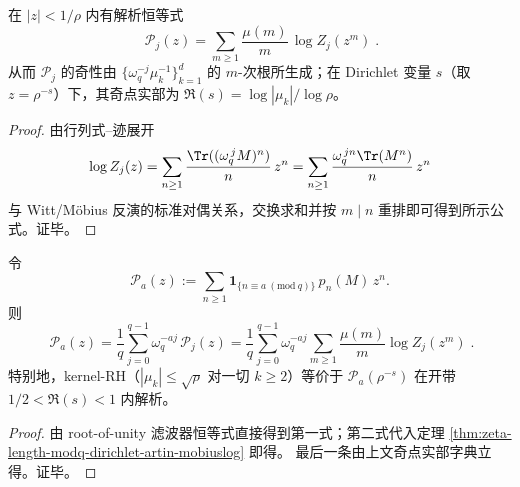 \begin{theorem}\label{thm:zeta-length-modq-dirichlet-artin-mobiuslog}
在 \(|z|<1/\rho\) 内有解析恒等式
\[
\boxed{\;
\mathcal{P}_j(z)=\sum_{m\ge1}\frac{\mu(m)}{m}\,\log Z_j(z^m)\; }.
\]
从而 \(\mathcal{P}_j\) 的奇性由 \(\{\omega_q^{-j}\mu_k^{-1}\}_{k=1}^d\) 的 \(m\)-次根所生成；在 Dirichlet 变量 \(s\)（取 \(z=\rho^{-s}\)）下，其奇点实部为
\(
\Re(s)=\log|\mu_k|/\log\rho
\)。
\end{theorem}
\begin{proof}
由行列式--迹展开
\[
\log Z_j(z)=\sum_{n\ge1}\frac{\Tr((\omega_q^{\,j}M)^n)}{n}\,z^n
=\sum_{n\ge1}\frac{\omega_q^{\,jn}\Tr(M^n)}{n}\,z^n
\]
与 Witt/Möbius 反演的标准对偶关系，交换求和并按 \(m\mid n\) 重排即可得到所示公式。证毕。
\end{proof}

\begin{corollary}\label{cor:zeta-length-modq-artin-decomposition}
令
\[
\mathcal{P}_a(z):=\sum_{n\ge1}\mathbf 1_{\{n\equiv a\ (\mathrm{mod}\ q)\}}\,p_n(M)\,z^n.
\]
则
\[
\boxed{\;
\mathcal{P}_a(z)
=\frac{1}{q}\sum_{j=0}^{q-1}\omega_q^{-aj}\,\mathcal{P}_j(z)
=\frac{1}{q}\sum_{j=0}^{q-1}\omega_q^{-aj}\sum_{m\ge1}\frac{\mu(m)}{m}\log Z_j(z^m)\; }.
\]
特别地，kernel-RH（\(|\mu_k|\le \sqrt{\rho}\) 对一切 \(k\ge2\)）等价于 \(\mathcal{P}_a(\rho^{-s})\) 在开带 \(1/2<\Re(s)<1\) 内解析。
\end{corollary}
\begin{proof}
由 root-of-unity 滤波器恒等式直接得到第一式；第二式代入定理 \ref{thm:zeta-length-modq-dirichlet-artin-mobiuslog} 即得。
最后一条由上文奇点实部字典立得。证毕。
\end{proof}

